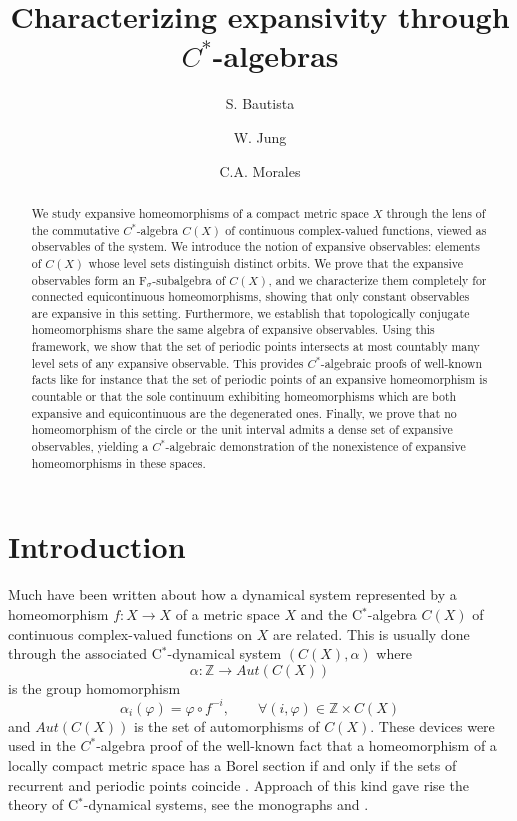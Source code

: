 \documentclass[11pt,letterpaper]{amsart}
\title[Characterizing expansivity through $C^*$-algebras]{Characterizing expansivity through $C^*$-algebras}
\author{S. Bautista}
\author{W. Jung}
\author{C.A. Morales}
\begin{document}
\begin{abstract}
We study expansive homeomorphisms of a compact metric space \(X\) through the lens of the commutative \(C^*\)-algebra \(C(X)\) of continuous complex-valued functions, viewed as observables of the system. We introduce the notion of expansive observables: elements of \(C(X)\) whose level sets distinguish distinct orbits. We prove that the expansive observables form an F\(_\sigma\)-subalgebra of \(C(X)\), and we characterize them completely for connected equicontinuous homeomorphisms, showing that only constant observables are expansive in this setting. Furthermore, we establish that topologically conjugate homeomorphisms share the same algebra of expansive observables. Using this framework, we show that the set of periodic points intersects at most countably many level sets of any expansive observable. This provides $C^*$-algebraic proofs of well-known facts like for instance that the set of periodic points of an expansive homeomorphism is countable or that the sole continuum exhibiting homeomorphisms which are both expansive and equicontinuous are the degenerated ones. Finally, we prove that no homeomorphism of the circle or the unit interval admits a dense set of expansive observables, yielding a $C^*$-algebraic demonstration of the nonexistence of expansive homeomorphisms in these spaces.
\end{abstract}

\maketitle

\section{Introduction}



\noindent
Much have been written about how a dynamical system represented by a homeomorphism $f:X\to X$ of a metric space $X$ and the C$^*$-algebra $C(X)$ of continuous complex-valued functions on $X$ are related.
This is usually done through the associated 
C$^*$-dynamical system
$(C(X),\alpha)$ where
$$
\alpha:\mathbb{Z}\to Aut(C(X))
$$
is the group homomorphism
$$
\alpha_i(\varphi)=\varphi\circ f^{-i},
\quad
\quad\forall (i,\varphi)\in\mathbb{Z}\times C(X)
$$
and $Aut(C(X))$ is the set of automorphisms of $C(X)$.
These devices were used in the $C^*$-algebra proof of the well-known fact that a homeomorphism of a locally compact metric space has a Borel section if and only if the sets of recurrent and periodic points coincide \cite{st}.
Approach of this kind gave rise the theory of C$^*$-dynamical systems, see the monographs \cite{t1} and \cite{t2}.
\end{document}
